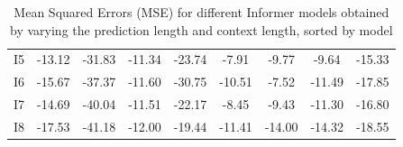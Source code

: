 \begin{table}[ht]
{\begin{tabular}{ccccccccc}
    \rowcolor[HTML]{F8696B} 
    \cellcolor[HTML]{FFFFFF}I5 & -13.12                         & \cellcolor[HTML]{FCAE79}-31.83 & -11.34                         & \cellcolor[HTML]{FED280}-23.74 & -7.91                          & \cellcolor[HTML]{FDBF7C}-9.77  & -9.64                          & -15.33                         \\
    \cellcolor[HTML]{FFFFFF}I6 & \cellcolor[HTML]{DAE081}-15.67 & \cellcolor[HTML]{FFE984}-37.37 & \cellcolor[HTML]{FECB7E}-11.60 & \cellcolor[HTML]{9ECF7E}-30.75 & \cellcolor[HTML]{FED680}-10.51 & \cellcolor[HTML]{FA8B72}-7.52  & \cellcolor[HTML]{FFE383}-11.49 & \cellcolor[HTML]{F8E983}-17.85 \\
    \cellcolor[HTML]{FFFFFF}I7 & \cellcolor[HTML]{FAE983}-14.69 & \cellcolor[HTML]{9ECF7E}-40.04 & \cellcolor[HTML]{FCA878}-11.51 & \cellcolor[HTML]{FDB57A}-22.17 & \cellcolor[HTML]{FA8070}-8.45  & \cellcolor[HTML]{FDB77A}-9.43  & \cellcolor[HTML]{FED680}-11.30 & \cellcolor[HTML]{FEC97E}-16.80 \\
    \cellcolor[HTML]{FFFFFF}I8 & \cellcolor[HTML]{9CCE7E}-17.53 & \cellcolor[HTML]{71C27B}-41.18 & \cellcolor[HTML]{FDEA83}-12.00 & \cellcolor[HTML]{FA8471}-19.44 & \cellcolor[HTML]{FBE983}-11.41 & \cellcolor[HTML]{E5E382}-14.00 & \cellcolor[HTML]{C1D980}-14.32 & \cellcolor[HTML]{EFE683}-18.55 \\
    \end{tabular}%
    }
    \caption{Mean Squared Errors (MSE) for different Informer models obtained by varying the prediction length and context length, sorted by model}
    \label{I1_M}
    \end{table}

